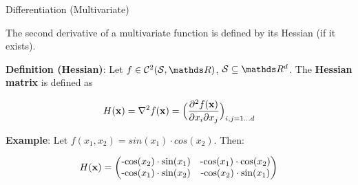 \begin{vbframe}{Differentiation (Multivariate)}

The second derivative of a multivariate function is defined by its Hessian (if it exists). 

\lz 


  \textbf{Definition (Hessian)}: Let $f \in \mathcal{C}^2(\mathcal{S}, \R)$, $\mathcal{S}\subseteq \R^d$. The \textbf{Hessian matrix} is defined as

  \[ H(\mathbf{x}) =\nabla^2 f(\mathbf{x}) =
  \Bigl(\frac{\partial^2 f(\mathbf{x})}{\partial x_i \partial x_j}\Bigr)_{i,j=1\ldots d}\]
  
\lz 

\textbf{Example}: Let $f(x_1,x_2) = sin(x_1) \cdot cos(x_2)$. Then:

$$
H(\mathbf{x}) = \begin{pmatrix}
\text{-cos}(x_2)\cdot\text{sin}(x_1) & \text{-cos}(x_1)\cdot\text{cos}(x_2) 
\\ \text{-cos}(x_1)\cdot\text{sin}(x_2) & \text{-cos}(x_2)\cdot\text{sin}(x_1) 
\end{pmatrix}
$$


\end{vbframe}

